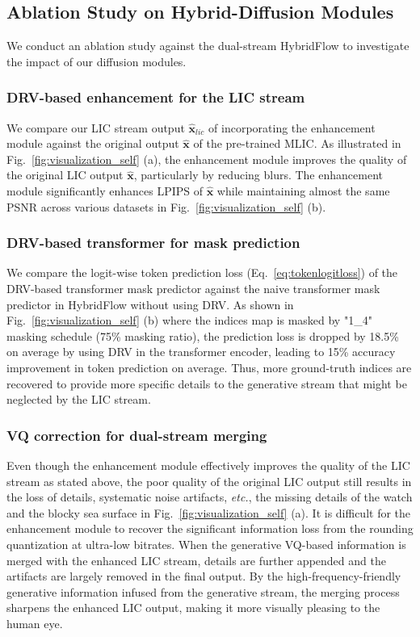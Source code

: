 \subsection{Ablation Study on Hybrid-Diffusion Modules}
We conduct an ablation study against the dual-stream HybridFlow to investigate the impact of our diffusion modules.

\subsubsection{DRV-based enhancement for the LIC stream}
We compare our LIC stream output ${\hat{\textbf{x}}}_{lic}$ of incorporating the enhancement module against the original output ${\hat{\textbf{x}}}$ of the pre-trained MLIC. As illustrated in Fig.~\ref{fig:visualization_self} (a), the enhancement module improves the quality of the original LIC output ${\hat{\textbf{x}}}$, particularly by reducing blurs. The enhancement module significantly enhances LPIPS of ${\hat{\textbf{x}}}$ while maintaining almost the same PSNR across various datasets in Fig.~\ref{fig:visualization_self} (b).

\subsubsection{DRV-based transformer for mask prediction}
We compare the logit-wise token prediction loss (Eq.~\ref{eq:tokenlogitloss}) of the DRV-based transformer mask predictor against the naive transformer mask predictor in HybridFlow without using DRV. As shown in Fig.~\ref{fig:visualization_self} (b) where the indices map is masked by "1\_4" masking schedule (75\% masking ratio), the prediction loss is dropped by 18.5\% on average by using DRV in the transformer encoder, leading to 15\% accuracy improvement in token prediction on average. Thus, more ground-truth indices are recovered to provide more specific details to the generative stream that might be neglected by the LIC stream.

\subsubsection{VQ correction for dual-stream merging} Even though the enhancement module effectively improves the quality of the LIC stream as stated above, the poor quality of the original LIC output still results in the loss of details, systematic noise artifacts, \textit{etc.}, the missing details of the watch and the blocky sea surface in Fig.~\ref{fig:visualization_self} (a). It is difficult for the enhancement module to recover the significant information loss from the rounding quantization at ultra-low bitrates. When the generative VQ-based information is merged with the enhanced LIC stream, details are further appended and the artifacts are largely removed in the final output. By the high-frequency-friendly generative information infused from the generative stream, the merging process sharpens the enhanced LIC output, making it more visually pleasing to the human eye.
